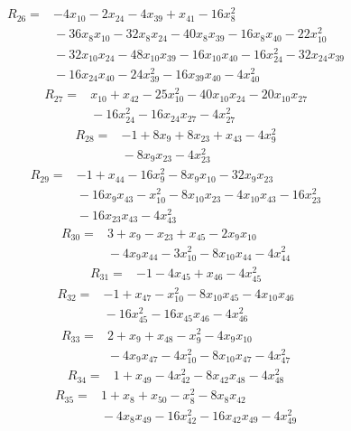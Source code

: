 \begin{align*}
R_{26} ={}& -4x_{10} - 2x_{24} - 4x_{39} + x_{41} - 16x_{8}^{2} \\
&{} -36x_{8} x_{10} - 32x_{8} x_{24} - 40x_{8} x_{39} - 16x_{8} x_{40} - 22x_{10}^{2} \\
&{} -32x_{10} x_{24} - 48x_{10} x_{39} - 16x_{10} x_{40} - 16x_{24}^{2} - 32x_{24} x_{39} \\
&{} -16x_{24} x_{40} - 24x_{39}^{2} - 16x_{39} x_{40} - 4x_{40}^{2}
\end{align*}
\begin{align*}
R_{27} ={}& x_{10} + x_{42} - 25x_{10}^{2} - 40x_{10} x_{24} - 20x_{10} x_{27} \\
&{} -16x_{24}^{2} - 16x_{24} x_{27} - 4x_{27}^{2}
\end{align*}
\begin{align*}
R_{28} ={}& -1 + 8x_{9} + 8x_{23} + x_{43} - 4x_{9}^{2} \\
&{} -8x_{9} x_{23} - 4x_{23}^{2}
\end{align*}
\begin{align*}
R_{29} ={}& -1 + x_{44} - 16x_{9}^{2} - 8x_{9} x_{10} - 32x_{9} x_{23} \\
&{} -16x_{9} x_{43} - x_{10}^{2} - 8x_{10} x_{23} - 4x_{10} x_{43} - 16x_{23}^{2} \\
&{} -16x_{23} x_{43} - 4x_{43}^{2}
\end{align*}
\begin{align*}
R_{30} ={}& 3 + x_{9} - x_{23} + x_{45} - 2x_{9} x_{10} \\
&{} -4x_{9} x_{44} - 3x_{10}^{2} - 8x_{10} x_{44} - 4x_{44}^{2}
\end{align*}
\begin{align*}
R_{31} ={}& -1 - 4x_{45} + x_{46} - 4x_{45}^{2}
\end{align*}
\begin{align*}
R_{32} ={}& -1 + x_{47} - x_{10}^{2} - 8x_{10} x_{45} - 4x_{10} x_{46} \\
&{} -16x_{45}^{2} - 16x_{45} x_{46} - 4x_{46}^{2}
\end{align*}
\begin{align*}
R_{33} ={}& 2 + x_{9} + x_{48} - x_{9}^{2} - 4x_{9} x_{10} \\
&{} -4x_{9} x_{47} - 4x_{10}^{2} - 8x_{10} x_{47} - 4x_{47}^{2}
\end{align*}
\begin{align*}
R_{34} ={}& 1 + x_{49} - 4x_{42}^{2} - 8x_{42} x_{48} - 4x_{48}^{2}
\end{align*}
\begin{align*}
R_{35} ={}& 1 + x_{8} + x_{50} - x_{8}^{2} - 8x_{8} x_{42} \\
&{} -4x_{8} x_{49} - 16x_{42}^{2} - 16x_{42} x_{49} - 4x_{49}^{2}
\end{align*}

